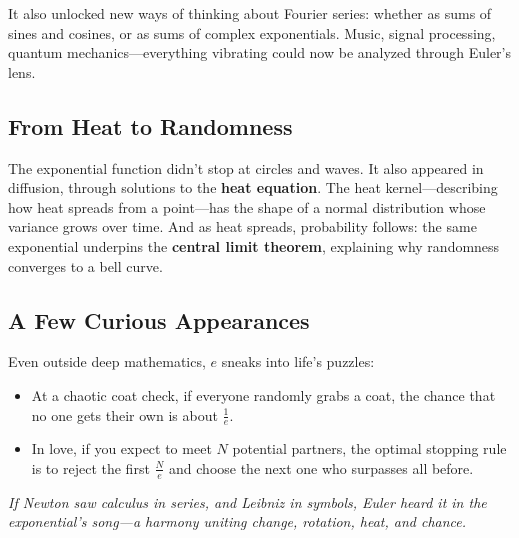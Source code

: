 It also unlocked new ways of thinking about Fourier series: whether as sums of sines and cosines, or as sums of complex exponentials. Music, signal processing, quantum mechanics—everything vibrating could now be analyzed through Euler’s lens.

\vspace{1em}

\subsection{From Heat to Randomness}

The exponential function didn’t stop at circles and waves. It also appeared in diffusion, through solutions to the \textbf{heat equation}. The heat kernel—describing how heat spreads from a point—has the shape of a normal distribution whose variance grows over time. And as heat spreads, probability follows: the same exponential underpins the \textbf{central limit theorem}, explaining why randomness converges to a bell curve.

\vspace{1em}

\subsection{A Few Curious Appearances}

Even outside deep mathematics, \( e \) sneaks into life’s puzzles:

\begin{itemize}
    \item At a chaotic coat check, if everyone randomly grabs a coat, the chance that no one gets their own is about \( \frac{1}{e} \).
    \item In love, if you expect to meet \( N \) potential partners, the optimal stopping rule is to reject the first \( \frac{N}{e} \) and choose the next one who surpasses all before.
\end{itemize}

\vspace{1em}

\begin{center}
\textit{If Newton saw calculus in series, and Leibniz in symbols, Euler heard it in the exponential’s song—a harmony uniting change, rotation, heat, and chance.}
\end{center}